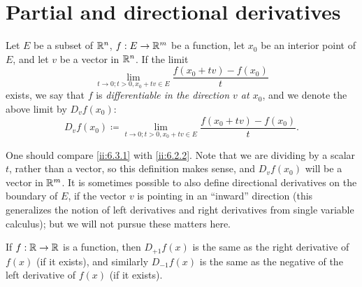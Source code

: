 \section{Partial and directional derivatives}\label{ii:sec:6.3}

\begin{defn}\label{ii:6.3.1}
  Let \(E\) be a subset of \(\mathbb{R}^n\), \(f : E \to \mathbb{R}^m\) be a function, let \(x_0\) be an interior point of \(E\), and let \(v\) be a vector in \(\mathbb{R}^n\).
  If the limit
  \[
    \lim_{t \to 0 ; t > 0, x_0 + tv \in E} \dfrac{f(x_0 + tv) - f(x_0)}{t}
  \]
  exists, we say that \(f\) is \emph{differentiable in the direction \(v\) at \(x_0\)}, and we denote the above limit by \(D_v f(x_0)\):
  \[
    D_v f(x_0) \coloneqq \lim_{t \to 0 ; t > 0, x_0 + tv \in E} \dfrac{f(x_0 + tv) - f(x_0)}{t}.
  \]
\end{defn}

\begin{rmk}\label{ii:6.3.2}
  One should compare \cref{ii:6.3.1} with \cref{ii:6.2.2}.
  Note that we are dividing by a scalar \(t\), rather than a vector, so this definition makes sense, and \(D_v f(x_0)\) will be a vector in \(\mathbb{R}^m\).
  It is sometimes possible to also define directional derivatives on the boundary of \(E\), if the vector \(v\) is pointing in an ``inward'' direction
  (this generalizes the notion of left derivatives and right derivatives from single variable calculus);
  but we will not pursue these matters here.
\end{rmk}

\begin{eg}\label{ii:6.3.3}
  If \(f : \mathbb{R} \to \mathbb{R}\) is a function, then \(D_{+1} f(x)\) is the same as the right derivative of \(f(x)\) (if it exists), and similarly \(D_{-1} f(x)\) is the same as the negative of the left derivative of \(f(x)\) (if it exists).
\end{eg}

